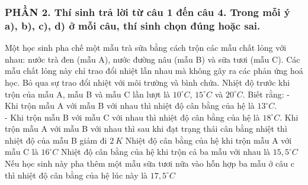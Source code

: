 \subsubsection*{PHẦN 2. Thí sinh trả lời từ câu 1 đến câu 4. Trong mỗi ý a), b), c), d) ở mỗi câu, thí sinh chọn đúng hoặc sai.}
\setcounter{ex}{0}
\begin{ex}
	Một học sinh pha chế một mẫu trà sữa bằng cách trộn các mẫu chất lỏng với nhau: nước trà đen (mẫu A), nước đường nâu (mẫu B) và sữa tươi (mẫu C). Các mẫu chất lỏng này chỉ trao đổi nhiệt lẫn nhau mà không gây ra các phản ứng hoá học. Bỏ qua sự trao đổi nhiệt với môi trường và bình chứa. Nhiệt độ trước khi trộn của mẫu A, mẫu B và mẫu C lần lượt là $10^{\circ}C$, $15^{\circ}C$ và $20^{\circ}C$. Biết rằng:
	- Khi trộn mẫu A với mẫu B với nhau thì nhiệt độ cân bằng của hệ là $13^{\circ}C$.\\
	- Khi trộn mẫu B với mẫu C với nhau thì nhiệt độ cân bằng của hệ là $18^{\circ}C$.
	\choiceTFt
	{\True Khi trộn mẫu A với mẫu B với nhau thì sau khi đạt trạng thái cân bằng nhiệt thì nhiệt độ của mẫu B giảm đi $2\ K$}
	{Nhiệt độ cân bằng của hệ khi trộn mẫu A với mẫu C là $16^{\circ}C$}
	{Nhiệt độ cân bằng của hệ khi trộn cả ba mẫu với nhau là $15,5^{\circ}C$}
	{\True Nếu học sinh này pha thêm một mẫu sữa tươi nữa vào hỗn hợp ba mẫu ở câu c thì nhiệt độ cân bằng của hệ lúc này là $17,5^{\circ}C$}
\end{ex}

